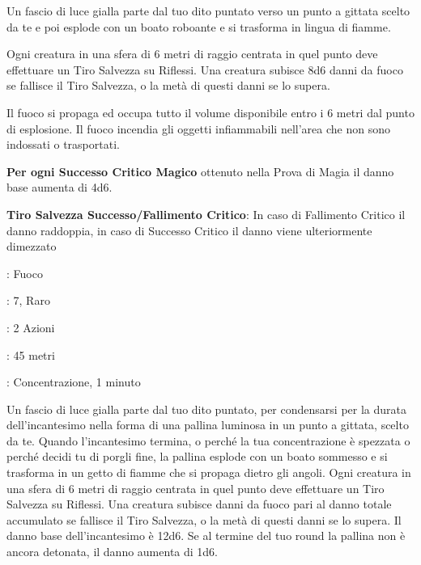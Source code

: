 \begin{multicols}{2}
Un fascio di luce gialla parte dal tuo dito puntato verso un punto a gittata scelto da te e poi esplode con un boato roboante e si trasforma in lingua di fiamme.

Ogni creatura in una sfera di 6 metri di raggio centrata in quel punto deve effettuare un Tiro Salvezza su Riflessi. Una creatura subisce 8d6 danni da fuoco se fallisce il Tiro Salvezza, o la metà di questi danni se lo supera.

Il fuoco si propaga ed occupa tutto il volume disponibile entro i 6 metri dal punto di esplosione. Il fuoco incendia gli oggetti infiammabili nell'area che non sono indossati o trasportati.

\textbf{Per ogni Successo Critico Magico} ottenuto nella Prova di Magia il danno base aumenta di 4d6.

\textbf{Tiro Salvezza Successo/Fallimento Critico}: In caso di Fallimento Critico il danno raddoppia, in caso di Successo Critico il danno viene ulteriormente dimezzato

\noindent\colorbox{OBSSgold!10}{
\begin{minipage}{0.95\linewidth}
\begin{description}[noitemsep, topsep=0pt, parsep=0pt, partopsep=0pt, leftmargin=0cm, labelwidth=1.3cm]
	\item[\textbf{Lista}]: Fuoco
	\item[\textbf{Livello}]: 7, Raro
	\item[\textbf{Lancio}]: 2 Azioni
	\item[\textbf{Gittata}]: 45 metri
	\item[\textbf{Durata}]: Concentrazione, 1 minuto
\end{description}
\end{minipage}}\smallskip

Un fascio di luce gialla parte dal tuo dito puntato, per condensarsi per la durata dell'incantesimo nella forma di una pallina luminosa in un punto a gittata, scelto da te. Quando l'incantesimo termina, o perché la tua concentrazione è spezzata o perché decidi tu di porgli fine, la pallina esplode con un boato sommesso e si trasforma in un getto di fiamme che si propaga dietro gli angoli. Ogni creatura in una sfera di 6 metri di raggio centrata in quel punto deve effettuare un Tiro Salvezza su Riflessi. Una creatura subisce danni da fuoco pari al danno totale accumulato se fallisce il Tiro Salvezza, o la metà di questi danni se lo supera. Il danno base dell'incantesimo è 12d6. Se al termine del tuo round la pallina non è ancora detonata, il danno aumenta di 1d6.


\end{multicols}

